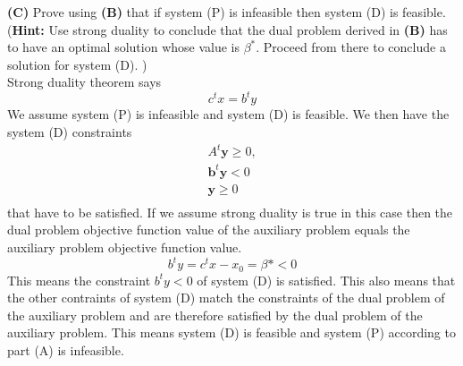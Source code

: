 \documentclass[11pt]{article}
\begin{document}
\medskip

\noindent\textbf{(C)} Prove using \textbf{(B)}  that if system 
\textsf{(P)} is infeasible then system \textsf{(D)} is feasible. (\textbf{Hint:} Use
strong duality to conclude that the dual problem derived in 
\textbf{(B)} has to have an optimal solution whose value
is $\beta^*$. Proceed from there to conclude a solution for system 
(D). )
\\
Strong duality theorem says
\[
c^tx = b^ty
\]
We assume system (P) is infeasible and system (D) is feasible.  We then have the system (D) constraints
\[ \begin{array}{l}
A^t \mathbf{y} \geq 0,\\
\mathbf{b}^t \mathbf{y} < 0\\
\mathbf{y} \geq 0 \\
\end{array}\]
that have to be satisfied.  If we assume strong duality is true in this case then the dual problem objective function value of the auxiliary problem equals the auxiliary problem objective function value.
\[
b^ty = c^tx - x_0 = \beta* < 0
\]
This means the constraint $b^ty < 0$ of system (D) is satisfied.  This also means that the other contraints of system (D) match the constraints of the dual problem of the auxiliary problem and are therefore satisfied by the dual problem of the auxiliary problem.  This means system (D) is feasible and system (P) according to part (A) is infeasible.
\end{document}

